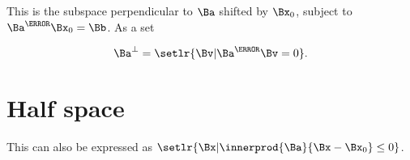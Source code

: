 This is the subspace perpendicular to \( \Ba \) shifted by \(\Bx_0\), subject to \( \Ba^\T \Bx_0 = \Bb \).  As a set

\begin{equation}\label{eqn:convexOptimizationLecture3:760}
\Ba^\perp = \setlr{ \Bv | \Ba^\T \Bv = 0 }.
\end{equation}

\section{Half space}


This can also be expressed as \( \setlr{ \Bx | \innerprod{ \Ba }{\Bx - \Bx_0 } \le 0 } \).

\EndNoBibArticle
